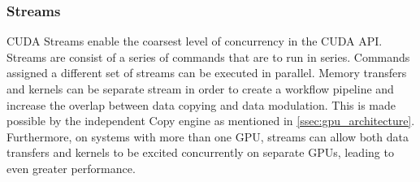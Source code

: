 \subsubsection{Streams}\label{sssec:streams}
CUDA Streams enable the coarsest level of concurrency in the CUDA API.  Streams
are consist of a series of commands that are to run in series.  Commands assigned
a different set of streams can be executed in parallel. Memory transfers and
kernels can be separate stream in order to create a workflow pipeline and increase
the overlap between data copying and data modulation. This is made possible by the
independent Copy engine as mentioned in \ref{ssec:gpu_architecture}.  Furthermore,
on systems with more than one \Gls{GPU}, streams can allow both data transfers and
kernels to be excited concurrently on separate \Glspl{GPU}, leading to even greater
performance.
